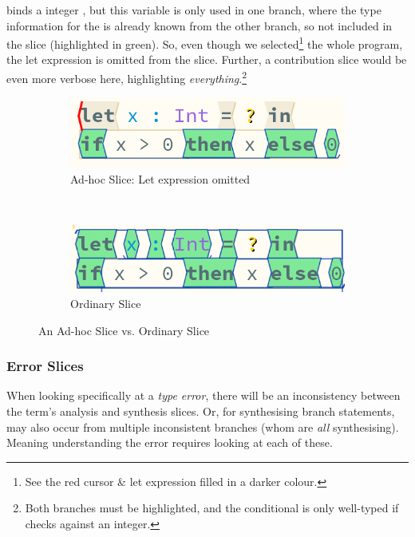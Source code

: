  binds a integer , but this variable is only used in one branch, where the type information for the  is already known from the other branch, so not included in the slice (highlighted in green). So, even though we selected\footnote{See the red cursor \& let expression filled in a darker colour.} the whole program, the let expression is omitted from the slice. Further, a contribution slice would be even more verbose here, highlighting \textit{everything}.\footnote{Both branches must be highlighted, and the conditional is only well-typed if  checks against an integer.}

\begin{figure}
\centering
\begin{subfigure}{0.45\textwidth}
\centering

\includegraphics[width=1\textwidth]{Media/Figures/Unused_let}
\caption{Ad-hoc Slice: Let expression omitted}
\end{subfigure}$\qquad$
\begin{subfigure}{0.45\textwidth}
\centering

\includegraphics[width=1\textwidth]{Media/Figures/Unused_let_ordinary}
\caption{Ordinary Slice}
\end{subfigure}

\caption{An Ad-hoc Slice vs. Ordinary Slice}
\label{fig:LetSliceOmitted}
\end{figure}


\subsubsection{Error Slices}
When looking specifically at a \textit{type error}, there will be an inconsistency between the term's analysis and synthesis slices. Or, for synthesising branch statements, may also occur from multiple inconsistent branches (whom are \textit{all} synthesising). Meaning understanding the error requires looking at each of these.

